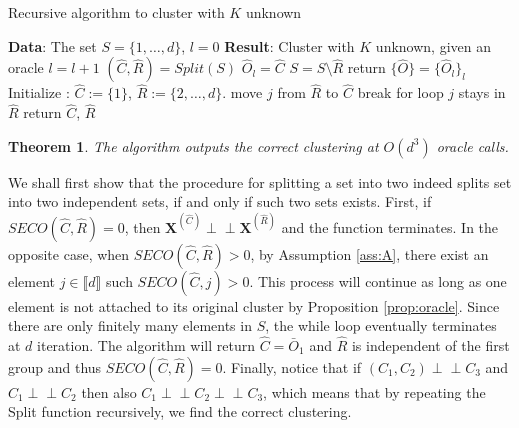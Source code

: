 \documentclass[11pt]{article}
\makeatletter
\newtheorem{theorem}{Theorem}
\renewenvironment{proof}[1][\proofname]{\par
\pushQED{\qed}%
\normalfont \topsep6\p@\@plus6\p@\relax
\trivlist
\item\relax
{\textbf{
#1\@addpunct{ }}}\hspace\labelsep\ignorespaces
}{%
\popQED\endtrivlist\@endpefalse
}
\newcommand{\indep}{\perp \!\!\! \perp}
\makeatother
\begin{document}
	\begin{algorithm}

\caption{Recursive algorithm to cluster with $K$ unknown}

\begin{algorithmic}[1]
\State \textbf{Data}: The set $S = \{1,\dots,d\}$, $l = 0$
\State \textbf{Result}: Cluster with $K$ unknown, given an oracle
    		\State $l = l+1$
    		\State $(\hat{C}, \hat{R}) = Split(S)$
    		\State $\hat{O}_l = \hat{C}$
    		\State $S = S \setminus \hat{R}$
    \EndWhile
    \State return $\{\hat{O}\} = \{ \hat{O}_l \}_{l}$
\EndProcedure
{}
    \State Initialize : $\hat{C} := \{1\}$, $\hat{R} :=  \{2, \dots, d\}$.
    				\State move $j$ from $\hat{R}$ to $\hat{C}$
    				\State break for loop
    			\Else{}
    				\State $j$ stays in $\hat{R}$
    			\EndIf
    		\EndFor
    \EndWhile
    \State return $\hat{C}$, $\hat{R}$
\EndProcedure
\end{algorithmic}
\label{alg:rec}
\end{algorithm}

	\begin{theorem}
		The algorithm outputs the correct clustering at $O(d^3)$ oracle calls.
	\end{theorem}
	\begin{proof}
		We shall first show that the procedure for splitting a set into two indeed splits set into two independent sets, if and only if such two sets exists. First, if $SECO(\hat{C},\hat{R}) = 0$, then $\textbf{X}^{(\hat{C})} \indep \textbf{X}^{(\hat{R})}$ and the function terminates. In the opposite case, when $SECO(\hat{C},\hat{R}) > 0$, by Assumption \ref{ass:A}, there exist an element $j \in \llbracket d \rrbracket$ such $SECO(\hat{C}, j) > 0$. This process will continue as long as one element is not attached to its original cluster by Proposition \ref{prop:oracle}. Since there are only finitely many elements in $S$, the while loop eventually terminates at $d$ iteration. The algorithm will return $\hat{C} = \bar{O}_1$ and $\hat{R}$ is independent of the first group and thus $SECO(\hat{C}, \hat{R}) = 0$. Finally, notice that if $(C_1, C_2) \indep C_3$ and $C_1 \indep C_2$ then also $C_1 \indep C_2 \indep C_3$, which means that by repeating the Split function recursively, we find the correct clustering.
	\end{proof}
	
\end{document}
